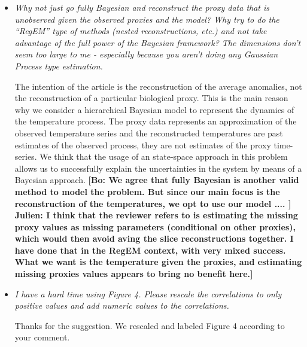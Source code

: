\documentclass[11pt]{article}
\newcommand{\lb}[1]{\color{ForestGreen}\textbf{[Luis B.: #1]}\normalcolor}
\newcommand{\bl}[1]{\color{red}\textbf{[Bo: #1]}\normalcolor}
\newcommand{\jeg}[1]{\color{blue}\textbf{Julien: #1]}\normalcolor}
\begin{document}
\begin{itemize}
\lb{I'm trying an unscreened version of the proxy dataset in order to answer
  this question.}
\bl{Thanks for trying this. Let's see what the results would tell. Intuitively, I feel this might be worse, as some data that are screened out are really noisy so including them may just deterioriate the resonstruction.}
\jeg{Important to point out that the screening was never against the global mean, but against *local* temperature (nearest grid points within a 2000km radius).}

\item \textit{Why not just go fully Bayesian and reconstruct the proxy data that
    is unobserved given the observed proxies and the model? Why try to do the
    ``RegEM'' type of methods (nested reconstructions, etc.) and not take
    advantage of the full power of the Bayesian framework? The dimensions don't
    seem too large to me - especially because you aren't doing any Gaussian
    Process type estimation.
}

The intention of the article is the reconstruction of the average anomalies,
not the reconstruction of a particular biological proxy. This is the main reason
why we consider a hierarchical Bayesian model to represent the dynamics of the temperature
process. The proxy data represents an approximation of the observed temperature
series and the reconstructed temperatures are past estimates of the observed
process, they are not estimates of the proxy time-series. We think that the
usage of an state-space approach in this problem allows us to successfully
explain the uncertainties in the system by means of a Bayesian approach. 
\bl{We agree that fully Bayesian is another valid method to model the problem. But since our main focus is the reconstruction of the temperatures, we opt to use our model ....  }
\jeg{I think that the reviewer refers to is estimating the missing proxy values as missing parameters (conditional on other proxies), which would then avoid aving the slice reconstructions together. I have done that in the RegEM context, with very mixed success. What we want is the temperature given the proxies, and estimating missing proxies values appears to bring no benefit here.}


\item \textit{I have a hard time using Figure 4. Please rescale the correlations
    to only positive values and add numeric values to the correlations.}

  Thanks for the suggestion. We rescaled and labeled Figure 4 according to your comment.


\end{itemize}
\end{document}
